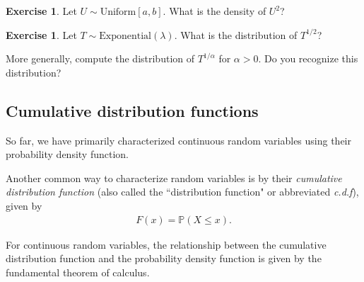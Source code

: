 \documentclass[11pt]{article}
\theoremstyle{definition}
\newtheorem{exercise}[]{Exercise}
\renewcommand{\P}{\mathbb{P}}
\begin{document}

\begin{exercise}
Let $U\sim \text{Uniform}[a, b]$. What is the density of $U^2$?
\end{exercise}


\begin{exercise}
Let $T \sim \text{Exponential}(\lambda)$. What is the distribution of
$T^{1/2}$?

More generally, compute the distribution of $T^{1/\alpha}$ for $\alpha > 0$.
Do you recognize this distribution?

\end{exercise}

\subsection{Cumulative distribution functions}

So far, we have primarily characterized continuous random
variables using their probability density function.

Another common way to characterize random variables is by
their \textit{cumulative distribution function} (also
called the ``distribution function" or abbreviated \textit{c.d.f}), given by
\begin{align}
  F(x) = \P(X \leq x).
  \label{eq:cdf}
\end{align}

For continuous random variables,
the relationship between the cumulative distribution
function and the probability density function is given
by the fundamental theorem of calculus.

\end{document}
